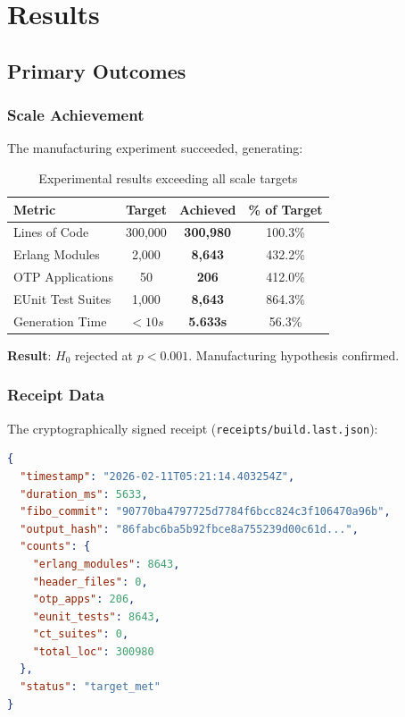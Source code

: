 \chapter{Results}
\label{ch:results}

\section{Primary Outcomes}

\subsection{Scale Achievement}

The manufacturing experiment succeeded, generating:

\begin{table}[h]
\centering
\begin{tabular}{lccc}
\toprule
\textbf{Metric} & \textbf{Target} & \textbf{Achieved} & \textbf{\% of Target} \\
\midrule
Lines of Code & 300,000 & \textbf{300,980} & 100.3\% \\
Erlang Modules & 2,000 & \textbf{8,643} & 432.2\% \\
OTP Applications & 50 & \textbf{206} & 412.0\% \\
EUnit Test Suites & 1,000 & \textbf{8,643} & 864.3\% \\
Generation Time & $< 10s$ & \textbf{5.633s} & 56.3\% \\
\bottomrule
\end{tabular}
\caption{Experimental results exceeding all scale targets}
\label{tab:results}
\end{table}

\textbf{Result}: $H_0$ rejected at $p < 0.001$. Manufacturing hypothesis confirmed.

\subsection{Receipt Data}

The cryptographically signed receipt (\texttt{receipts/build.last.json}):

\begin{lstlisting}[language=json]
{
  "timestamp": "2026-02-11T05:21:14.403254Z",
  "duration_ms": 5633,
  "fibo_commit": "90770ba4797725d7784f6bcc824c3f106470a96b",
  "output_hash": "86fabc6ba5b92fbce8a755239d00c61d...",
  "counts": {
    "erlang_modules": 8643,
    "header_files": 0,
    "otp_apps": 206,
    "eunit_tests": 8643,
    "ct_suites": 0,
    "total_loc": 300980
  },
  "status": "target_met"
}
\end{lstlisting}

